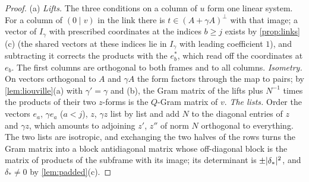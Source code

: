 \begin{proof}
(a) \emph{Lifts.} The three conditions on a column of $u$ form one linear system. For a column of $(0\mid v)$ in the link there is $t\in(A+\gamma A)^\perp$ with that image; a vector of $I_\gamma$ with prescribed coordinates at the
indices $b\ge j$ exists by \cref{prop:links}(c) (the shared vectors at these indices lie in $I_\gamma$ with leading coefficient $1$), and subtracting it corrects the products with the $e^*_b$, which read off the coordinates
at $e_b$. The first columns are orthogonal to both frames and to all columns. \emph{Isometry.} On vectors orthogonal to $A$ and $\gamma A$ the form factors through the map to pairs; by \cref{lem:liouville}(a) with $\gamma'=\gamma$
and (b), the Gram matrix of the lifts plus $N^{-1}$ times the products of their two $z$-forms is the $Q$-Gram matrix of $v$. \emph{The lists.} Order the vectors $e_a$, $\gamma e_a$ ($a<j$), $z$, $\gamma z$ list by list and
add $N$ to the diagonal entries of $z$ and $\gamma z$, which amounts to adjoining $z'$, $z''$ of norm $N$ orthogonal to everything. The two lists are isotropic, and exchanging the two halves of the rows turns the
Gram matrix into a block antidiagonal matrix whose off-diagonal block is the matrix of products of the subframe with its image; its determinant is $\pm\lvert \delta_*\rvert^2$, and $\delta_*\ne0$ by \cref{lem:padded}(c).


\end{proof}
